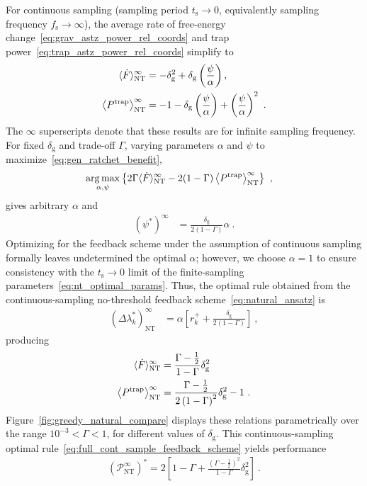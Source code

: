 \documentclass[%
reprint,
bibnotes, amsmath, amssymb, aps, pre,
 showkeys,
floatfix
]{revtex4-2}
\newcommand{\mrm}{\mathrm}
\newcommand{\mcal}{\mathcal}
\newcommand{\pr}[1]{\left(#1\right)} %
\newcommand{\sr}[1]{\left[#1\right]} %
\newcommand{\br}[1]{\left\{#1\right\}} %
\newcommand{\dg}{\delta_{\mrm{g}}}
\newcommand{\ts}{t_{\mrm{s}}}
\newcommand{\fs}{f_{\mrm{s}}}
\newcommand{\dlk}{\Delta\lambda_{k}}
\newcommand{\xkpr}{r_{k}^{+}}
\newcommand{\ept}{\ev{P^{\mrm{trap}}}}
\newcommand{\epg}{\langle\dot{F}\rangle}
\newcommand{\mP}{\mcal{P}}
\DeclareMathOperator*{\argmax}{arg\,max}
\begin{document}
For continuous sampling (sampling period $\ts\to 0$, equivalently sampling frequency $\fs\to\infty$), the average rate of free-energy change~\eqref{eq:grav_astz_power_rel_coords} and trap power~\eqref{eq:trap_astz_power_rel_coords} simplify to
\begin{align}
    \epg_{\mrm{NT}}^{\infty} &= - \dg^{2} + \dg\pr{\frac{\psi}{\alpha}},\label{eq:short_time_pgrav}\\
    \ept_{\mrm{NT}}^{\infty} &= -1 - \dg\pr{\frac{\psi}{\alpha}} + \pr{\frac{\psi}{\alpha}}^{2}\ .\label{eq:short_time_ptrap}
\end{align}
The $\infty$ superscripts denote that these results are for infinite sampling frequency. 
For fixed $\dg$ and trade-off $\Gamma$, varying parameters $\alpha$ and $\psi$ to maximize~\eqref{eq:gen_ratchet_benefit},
\begin{align}
    \argmax_{\alpha,\psi}&\br{2\Gamma\epg_{\mrm{NT}}^{\infty}-2(1-\Gamma)\ept_{\mrm{NT}}^{\infty}}\ ,
\end{align}
gives arbitrary $\alpha$ and
\begin{align}
    \pr{\psi^{*}}^{\infty} &= \frac{\dg}{2\pr{1-\Gamma}}\alpha\ . \label{eq:nt_cont_fs_opt_psi}
\end{align}
Optimizing for the feedback scheme under the assumption of continuous sampling formally leaves undetermined the optimal $\alpha$; however, we choose $\alpha = 1$ to ensure consistency with the $\ts\to 0$ limit of the finite-sampling parameters~\eqref{eq:nt_optimal_params}. 
Thus, the optimal rule obtained from the continuous-sampling no-threshold feedback scheme~\eqref{eq:natural_ansatz} is
\begin{align}
    \pr{\dlk^{*}}_{\mrm{NT}}^{\infty} &= \alpha\sr{\xkpr + \frac{\dg}{2(1-\Gamma)}}\ , \label{eq:full_cont_sample_feedback_scheme} 
\end{align} 
producing 
\begin{align}
    \epg^{\infty}_{\mrm{NT}} &= \frac{\Gamma-\tfrac{1}{2}}{1-\Gamma} \dg^2 \label{eq:natural_pgrav}\\
    \ept^{\infty}_{\mrm{NT}} &=  \frac{\Gamma-\tfrac{1}{2}}{2\pr{1-\Gamma}^{2}}\dg^{2} - 1\ . \label{eq:natural_ptrap}
\end{align}
Figure~\ref{fig:greedy_natural_compare} displays these relations parametrically over the range $10^{-3} < \Gamma < 1$, for different values of $\dg$.
This continuous-sampling optimal rule~\eqref{eq:full_cont_sample_feedback_scheme} yields performance 
\begin{align}
    \pr{\mP_{\mrm{NT}}^{\infty}}^{*} = 2\sr{1-\Gamma + \frac{\pr{\Gamma-\tfrac{1}{2}}^{2}}{1-\Gamma}\dg^{2}}\ .
\end{align}
\end{document}

